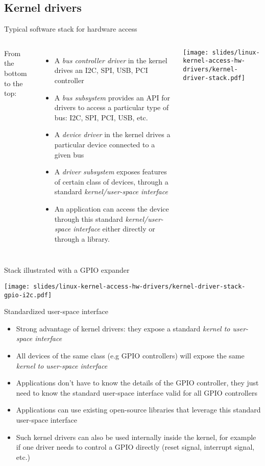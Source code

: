 \subsection{Kernel drivers}

\begin{frame}{Typical software stack for hardware access}
  \begin{columns}
    From the bottom to the top:
    \begin{itemize}
    \item A {\em bus controller driver} in the kernel drives an I2C,
      SPI, USB, PCI controller
    \item A {\em bus subsystem} provides an API for drivers to access
      a particular type of bus: I2C, SPI, PCI, USB, etc.
    \item A {\em device driver} in the kernel drives a particular
      device connected to a given bus
    \item A {\em driver subsystem} exposes features of certain class
      of devices, through a standard {\em kernel/user-space interface}
    \item An application can access the device through this standard {\em
        kernel/user-space interface} either directly or through a
      library.
    \end{itemize}
    \begin{center}
      \texttt{[image: slides/linux-kernel-access-hw-drivers/kernel-driver-stack.pdf]}
    \end{center}
  \end{columns}
\end{frame}

\begin{frame}{Stack illustrated with a GPIO expander}
  \begin{center}
    \texttt{[image: slides/linux-kernel-access-hw-drivers/kernel-driver-stack-gpio-i2c.pdf]}
  \end{center}
\end{frame}

\begin{frame}{Standardized user-space interface}
  \begin{itemize}
  \item Strong advantage of kernel drivers: they expose a standard
    {\em kernel to user-space interface}
  \item All devices of the same class (e.g GPIO controllers) will
    expose the same {\em kernel to user-space interface}
  \item Applications don't have to know the details of the GPIO
    controller, they just need to know the standard user-space
    interface valid for all GPIO controllers
  \item Applications can use existing open-source libraries that
    leverage this standard user-space interface
  \item Such kernel drivers can also be used internally inside the
    kernel, for example if one driver needs to control a GPIO directly
    (reset signal, interrupt signal, etc.)
  \end{itemize}
\end{frame}

